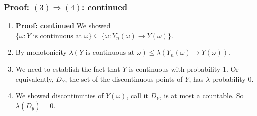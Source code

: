 \documentclass[handout]{beamer}
\begin{document}
\frame
{
  \frametitle{Proof: $(3) \Rightarrow (4)$: continued} 


\begin{enumerate}

\item \textbf{Proof: continued} We showed $\{\omega : Y \text{ is continuous at } \omega\} \subseteq  \{ \omega : Y_n(\omega) \rightarrow Y(\omega)\}$.

\item By monotonicity $\lambda(Y \text{ is continuous at } \omega ) \le  \lambda( Y_n(\omega) \rightarrow Y(\omega) )$.

\item We need to establish the fact that $Y$ is continuous with probability $1$. Or equivalently, $D_Y$, the set of the discontinuous points of $Y$, has $\lambda$-probability 0. 


\item We showed discontinuities of $Y(\omega)$, call it $D_Y$, is at most a countable. So $\lambda(D_y) = 0$.

\end{enumerate}
}
\end{document}
